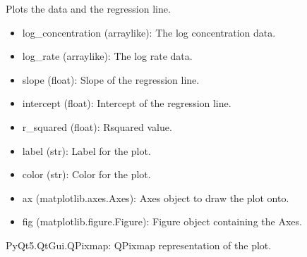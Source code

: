 \documentclass[a4paper,10pt,english]{sphinxmanual}
\begin{document}
\begin{fulllineitems}
\label{\detokenize{utils:src.utils.regression_analysis.plot_regression}}
\pysigstartsignatures
{}
\pysigstopsignatures
\sphinxAtStartPar
Plots the data and the regression line.
\begin{description}
\begin{itemize}
\item {} 
\sphinxAtStartPar
log\_concentration (array\sphinxhyphen{}like): The log concentration data.

\item {} 
\sphinxAtStartPar
log\_rate (array\sphinxhyphen{}like): The log rate data.

\item {} 
\sphinxAtStartPar
slope (float): Slope of the regression line.

\item {} 
\sphinxAtStartPar
intercept (float): Intercept of the regression line.

\item {} 
\sphinxAtStartPar
r\_squared (float): R\sphinxhyphen{}squared value.

\item {} 
\sphinxAtStartPar
label (str): Label for the plot.

\item {} 
\sphinxAtStartPar
color (str): Color for the plot.

\item {} 
\sphinxAtStartPar
ax (matplotlib.axes.Axes): Axes object to draw the plot onto.

\item {} 
\sphinxAtStartPar
fig (matplotlib.figure.Figure): Figure object containing the Axes.

\end{itemize}

\sphinxAtStartPar
PyQt5.QtGui.QPixmap: QPixmap representation of the plot.

\end{description}

\end{fulllineitems}
\end{document}
